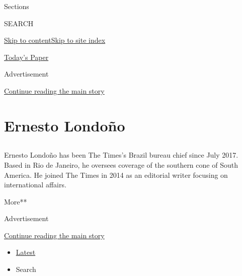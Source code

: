 Sections

SEARCH

\protect\hyperlink{site-content}{Skip to
content}\protect\hyperlink{site-index}{Skip to site index}

\href{https://myaccount.nytimes3xbfgragh.onion/auth/login?response_type=cookie\&client_id=vi}{}

\href{https://www.nytimes3xbfgragh.onion/section/todayspaper}{Today's
Paper}

Advertisement

\protect\hyperlink{after-top}{Continue reading the main story}

\hypertarget{ernesto-londouxf1o}{%
\section{Ernesto Londoño}\label{ernesto-londouxf1o}}

\subsection{}

Ernesto Londoño has been The Times's Brazil bureau chief since July
2017. Based in Rio de Janeiro, he oversees coverage of the southern cone
of South America. He joined The Times in 2014 as an editorial writer
focusing on international affairs.

More**

Advertisement

\protect\hyperlink{after-mid1}{Continue reading the main story}

\begin{itemize}
\tightlist
\item
  \protect\hyperlink{stream-panel}{Latest}
\item
  Search
\end{itemize}

